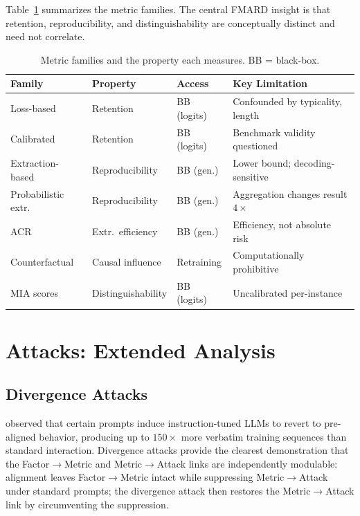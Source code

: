 \documentclass[11pt]{article}
\begin{document}
Table~\ref{tab:metric-families} summarizes the metric families.
The central FMARD insight is that retention, reproducibility, and
distinguishability are conceptually distinct and need not correlate.

\begin{table}[t]
\centering
\small
\begin{tabular}{@{}p{2.0cm}p{1.8cm}p{2.2cm}p{4.5cm}@{}}
\toprule
\textbf{Family} & \textbf{Property} & \textbf{Access} & \textbf{Key Limitation} \\
\midrule
Loss-based        & Retention         & BB (logits) & Confounded by typicality, length \\
Calibrated        & Retention         & BB (logits) & Benchmark validity questioned~\citep{meeus2025sok} \\
Extraction-based  & Reproducibility   & BB (gen.) & Lower bound; decoding-sensitive \\
Probabilistic extr. & Reproducibility & BB (gen.) & Aggregation changes result $4\times$ \\
ACR               & Extr.\ efficiency & BB (gen.) & Efficiency, not absolute risk \\
Counterfactual    & Causal influence  & Retraining & Computationally prohibitive \\
MIA scores        & Distinguishability & BB (logits) & Uncalibrated per-instance~\citep{zhang2025membershipinferenceattacksprove} \\
\bottomrule
\end{tabular}
\caption{Metric families and the property each measures. BB = black-box.}
\label{tab:metric-families}
\end{table}


\section{Attacks: Extended Analysis}
\label{app:attacks}

\subsection{Divergence Attacks}

\citet{nasr2023scalableextractiontrainingdata} observed that certain prompts
induce instruction-tuned LLMs to revert to pre-aligned behavior, producing up
to $150\times$ more verbatim training sequences than standard interaction.
Divergence attacks provide the clearest demonstration that the
Factor$\to$Metric and Metric$\to$Attack links are independently modulable:
alignment leaves Factor$\to$Metric intact while suppressing Metric$\to$Attack
under standard prompts; the divergence attack then restores the
Metric$\to$Attack link by circumventing the suppression.
\end{document}
